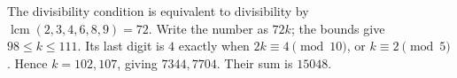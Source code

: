 The divisibility condition is equivalent to divisibility by $\operatorname{lcm}(2,3,4,6,8,9)=72$. Write the number as $72k$; the bounds give $98\le k\le111$. Its last digit is $4$ exactly when $2k\equiv4\pmod{10}$, or $k\equiv2\pmod5$. Hence $k=102,107$, giving $7344,7704$. Their sum is $\boxed{15048}$.
